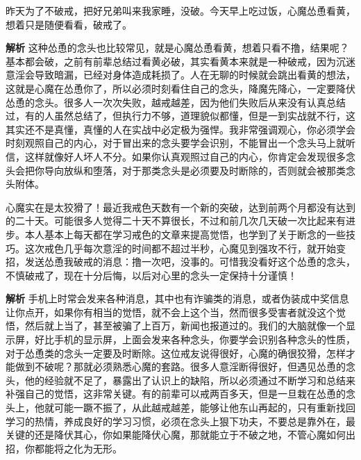 \begin{case}[心魔会帮你找借口]
    昨天为了不破戒，把好兄弟叫来我家睡，没破。今天早上吃过饭，心魔怂恿看黄，想着只是随便看看，破戒了。

    \textbf{解析} 这种怂恿的念头也比较常见，就是心魔怂恿看黄，想着只看不撸，结果呢？基本都会破，之前有前辈总结过看黄必破，其实看黄本来就是一种破戒，因为沉迷意淫会导致暗漏，已经对身体造成耗损了。人在无聊的时候就会跳出看黄的想法，这就是心魔在怂恿你了，所以必须时刻看住自己的念头，降魔先降心，一定要降伏怂恿的念头。很多人一次次失败，越戒越差，因为他们失败后从来没有认真总结过，有的人虽然总结了，但执行力不够，道理貌似都懂，但是一到实战就不行，这其实还不是真懂，真懂的人在实战中必定极为强悍。我非常强调观心，你必须学会时刻观照自己的内心，对于冒出来的念头要学会识别，不能冒出一个念头马上就听信，这样就像好人坏人不分。如果你认真观照过自己的内心，你肯定会发现很多念头会把你导向放纵和堕落，对于那类念头是必须要及时断除的，否则就会被那类念头附体。
\end{case}

\begin{case}[脑中的短信]
    心魔实在是太狡猾了！最近我戒色天数有一个新的突破，达到前两个月都没有达到的二十天。可能很多人觉得二十天不算很长，不过和前几次几天破一次比起来有进步。本人基本上每天都在学习戒色的文章来提高觉悟，也学到了关于断念的一些技巧。这次戒色几乎每次意淫的时间都不超过半秒，心魔见到强攻不行，就开始变招，发送怂恿我破戒的消息：撸一次吧，没事的。可惜我没看好这个怂恿的念头，不慎破戒了，现在十分后悔，以后对心里的念头一定保持十分谨慎！

    \textbf{解析} 手机上时常会发来各种消息，其中也有诈骗类的消息，或者伪装成中奖信息让你点开，如果你有相当的觉悟，就不会上这个当，然而很多受害者就没这个觉悟，然后就上当了，甚至被骗了上百万，新闻也报道过的。我们的大脑就像一个显示屏，好比手机的显示屏，上面会发来各种念头，你要学会识别各种念头的性质，对于怂恿类的念头一定要及时断除。这位戒友说得很好，心魔的确很狡猾，怎样才能做到不破呢？那就必须熟悉心魔的套路。很多人意淫断得很好，但遇见怂恿的念头，他的经验就不足了，暴露出了认识上的缺陷，所以必须通过不断学习和总结来补强自己的觉悟，这非常关键。有的前辈可以戒两百多天，但是一旦栽在怂恿的念头上，他就可能一蹶不振了，从此越戒越差，能够让他东山再起的，只有重新找回学习的热情，养成良好的学习习惯，必须在念头上狠下功夫，不要总是靠外在，最关键的还是降伏其心，你如果能降伏心魔，那就能立于不破之地，不管心魔如何出招，你都能将之化为无形。
\end{case}

